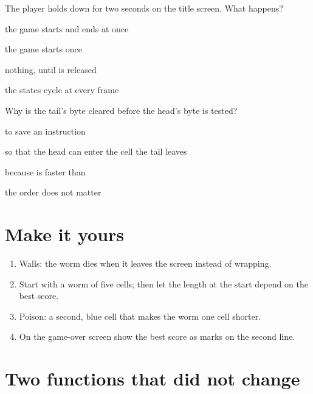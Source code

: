 \begin{quiz}{The player holds  down for two seconds on the title screen. What happens?}
\item the game starts and ends at once
\item the game starts once
\item nothing, until  is released
\item the states cycle at every frame
\end{quiz}

\begin{quiz}{Why is the tail's byte cleared before the head's byte is tested?}
\item to save an instruction
\item so that the head can enter the cell the tail leaves
\item because  is faster than 
\item the order does not matter
\end{quiz}

\section{Make it yours}

\begin{exercise}[on \prg]
\begin{enumerate}[nosep]
\item Walls: the worm dies when it leaves the screen instead of wrapping.
\item Start with a worm of five cells; then let the length at the start depend
  on the best score.
\item Poison: a second, blue cell that makes the worm one cell shorter.
\item On the game-over screen show the best score as marks on the second line.
\end{enumerate}
\end{exercise}

\section{Two functions that did not change}

